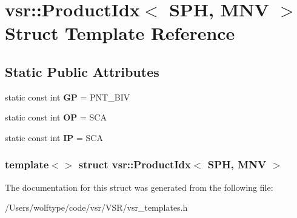 \hypertarget{structvsr_1_1_product_idx_3_01_s_p_h_00_01_m_n_v_01_4}{\section{vsr\-:\-:Product\-Idx$<$ S\-P\-H, M\-N\-V $>$ Struct Template Reference}
\label{structvsr_1_1_product_idx_3_01_s_p_h_00_01_m_n_v_01_4}
}
\subsection*{Static Public Attributes}
\begin{DoxyCompactItemize}
\item 
\hypertarget{structvsr_1_1_product_idx_3_01_s_p_h_00_01_m_n_v_01_4_a642ed8bffdd3d4c62edb3a8df3b8d072}{static const int {\bfseries G\-P} = P\-N\-T\-\_\-\-B\-I\-V}\label{structvsr_1_1_product_idx_3_01_s_p_h_00_01_m_n_v_01_4_a642ed8bffdd3d4c62edb3a8df3b8d072}

\item 
\hypertarget{structvsr_1_1_product_idx_3_01_s_p_h_00_01_m_n_v_01_4_abd5fe995c533a208cbf5dbff5ac53315}{static const int {\bfseries O\-P} = S\-C\-A}\label{structvsr_1_1_product_idx_3_01_s_p_h_00_01_m_n_v_01_4_abd5fe995c533a208cbf5dbff5ac53315}

\item 
\hypertarget{structvsr_1_1_product_idx_3_01_s_p_h_00_01_m_n_v_01_4_adfa76867880ada2fa45bde175b291d3c}{static const int {\bfseries I\-P} = S\-C\-A}\label{structvsr_1_1_product_idx_3_01_s_p_h_00_01_m_n_v_01_4_adfa76867880ada2fa45bde175b291d3c}

\end{DoxyCompactItemize}
\subsubsection*{template$<$$>$ struct vsr\-::\-Product\-Idx$<$ S\-P\-H, M\-N\-V $>$}



The documentation for this struct was generated from the following file\-:\begin{DoxyCompactItemize}
\item 
/\-Users/wolftype/code/vsr/\-V\-S\-R/vsr\-\_\-templates.\-h\end{DoxyCompactItemize}
